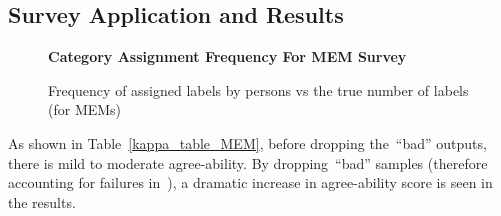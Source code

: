\documentclass[\main/thesis.tex]{subfiles}
\begin{document}
 \subsection{Survey Application and Results}
 \begin{table}[t]
\caption{\label{kappa_table_MEM}Table of Fleiss' kappa coefficient to measure the degree of agreement between persons (HvH) and persons and MEM. We measure the agreeability scores after dropping bad samples if both or either persons assigned the sample as such. We also measure agree-ability when all samples deemed \enquote{Bad} or \enquote{other} by either person are removed.}
\end{table}

\begin{figure}[htpb]
    \begin{center}
    \textbf{Category Assignment Frequency For MEM Survey}
    \end{center}
    \caption{Frequency of assigned labels by persons vs the true number of labels (for MEMs)}
\label{fig:freq-survey-2p}
\end{figure} 

 As shown in Table~\ref{kappa_table_MEM}, before dropping the~\enquote{bad} outputs, there is mild to moderate agree-ability. By dropping~\enquote{bad} samples (therefore accounting for failures in~\decfirst), a dramatic increase in agree-ability score is seen in the results.  
\end{document}
